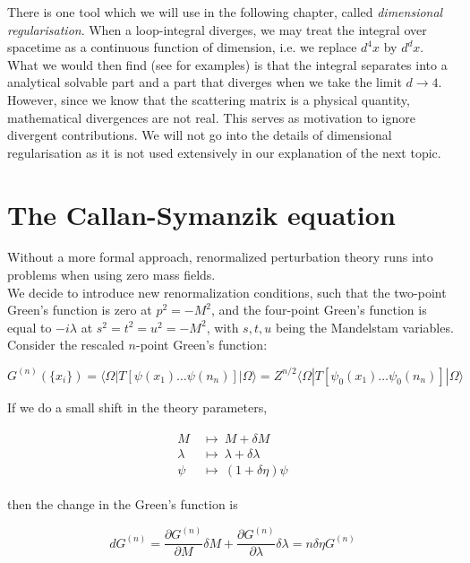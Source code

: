 \documentclass[10pt,twoside]{report}
\begin{document}
	There is one tool which we will use in the following chapter, called \emph{dimensional regularisation}. When a loop-integral diverges, we may treat the integral over spacetime as a continuous function of dimension, i.e. we replace $d^4x$ by $d^dx$. What we would then find (see \cite{PeskinSchroeder} for examples) is that the integral separates into a analytical solvable part and a part that diverges when we take the limit $d\rightarrow 4$. However, since we know that the scattering matrix is a physical quantity, mathematical divergences are not real. This serves as motivation to ignore divergent contributions. We will not go into the details of dimensional regularisation as it is not used extensively in our explanation of the next topic.
	
	\section{The Callan-Symanzik equation}
	Without a more formal approach, renormalized perturbation theory runs into problems when using zero mass fields. \\
	
	We decide to introduce new renormalization conditions, such that the two-point Green's function is zero at $p^2=-M^2$, and the four-point Green's function is equal to $-i\lambda$ at $s^2 = t^2 = u^2 = -M^2$, with $s,t,u$ being the Mandelstam variables.\\
	
	Consider the rescaled $n$-point Green's function:
	
	\begin{equation}
		G^{(n)}(\{x_i\}) = \langle\Omega|T[\psi(x_1)\ldots\psi(n_n)]|\Omega\rangle = Z^{n/2}\langle\Omega|T[\psi_0(x_1)\ldots\psi_0(n_n)]|\Omega\rangle
	\end{equation}
	
	If we do a small shift in the theory parameters,
	
	\begin{align}
		\begin{split}
			M \:&\mapsto\: M+\delta M \\
			\lambda \:&\mapsto\: \lambda+\delta \lambda \\
			\psi \:&\mapsto\: (1+\delta\eta)\psi
		\end{split}
	\end{align}
	
	\noindent then the change in the Green's function is
	
	\begin{equation}
		dG^{(n)} = \frac{\partial G^{(n)}}{\partial M}\delta M + \frac{\partial G^{(n)}}{\partial \lambda}\delta \lambda = n\delta\eta G^{(n)}
	\end{equation}
	
\end{document}
